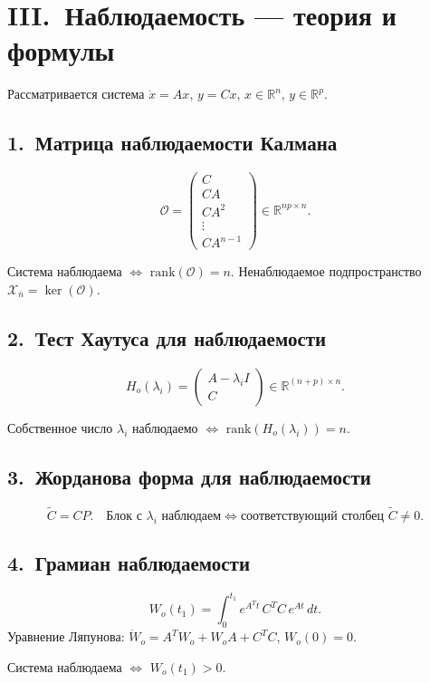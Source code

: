 \documentclass[12pt,a4paper]{article}
\begin{document}
	\section{III.~Наблюдаемость --- теория и формулы}
	
	Рассматривается система $\dot{x} = Ax$, $y = Cx$, $x \in \mathbb{R}^n$, $y \in \mathbb{R}^p$.
	
	\subsection{1.~Матрица наблюдаемости Калмана}
	\begin{formulabox}
		\[
		\mathcal{O} = \begin{pmatrix} C \\ CA \\ CA^2 \\ \vdots \\ CA^{n-1} \end{pmatrix} \in \mathbb{R}^{np \times n}.
		\]
	\end{formulabox}
	Система наблюдаема $\Leftrightarrow$ $\mathrm{rank}(\mathcal{O}) = n$. Ненаблюдаемое подпространство $\mathcal{X}_{\bar{n}} = \ker(\mathcal{O})$.
	
	\subsection{2.~Тест Хаутуса для наблюдаемости}
	\begin{formulabox}
		\[
		H_o(\lambda_i) = \begin{pmatrix} A - \lambda_i I \\ C \end{pmatrix} \in \mathbb{R}^{(n+p) \times n}.
		\]
	\end{formulabox}
	Собственное число $\lambda_i$ наблюдаемо $\Leftrightarrow$ $\mathrm{rank}(H_o(\lambda_i)) = n$.
	
	\subsection{3.~Жорданова форма для наблюдаемости}
	\begin{formulabox}
		\[
		\tilde{C} = CP.
		\quad\text{Блок с } \lambda_i \text{ наблюдаем}
		\Leftrightarrow
		\text{соответствующий столбец } \tilde{C} \neq 0.
		\]
	\end{formulabox}
	
	\subsection{4.~Грамиан наблюдаемости}
	\begin{formulabox}
		\[
		W_o(t_1) = \int_0^{t_1} e^{A^Tt}\,C^TC\,e^{At}\,dt.
		\]
		Уравнение Ляпунова: $\dot{W}_o = A^TW_o + W_oA + C^TC$, $W_o(0)=0$.
	\end{formulabox}
	Система наблюдаема $\Leftrightarrow$ $W_o(t_1) > 0$.
	
\end{document}
